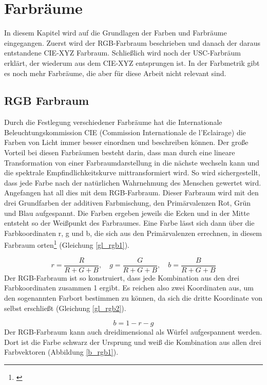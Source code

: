 \chapter{Farbräume} 
In diesem Kapitel wird auf die Grundlagen der Farben und Farbräume eingegangen. Zuerst wird der RGB-Farbraum beschrieben und danach der daraus entstandene CIE-XYZ Farbraum. Schließlich wird noch der USC-Farbräum erklärt, der wiederum aus dem CIE-XYZ entsprungen ist. In der Farbmetrik gibt es noch mehr Farbräume, die aber für diese Arbeit nicht relevant sind.
 
\section{RGB Farbraum} \label{sec_rgb}
Durch die Festlegung verschiedener Farbräume hat die  Internationale Beleuchtungskommission CIE (\glqq Commission Internationale de l'Eclairage\grqq) die Farben von Licht immer besser einordnen und beschreiben können. Der große Vorteil bei diesen Farbräumen besteht darin, dass man durch eine lineare Transformation von einer Farbraumdarstellung in die nächste wechseln kann und die spektrale Empfindlichkeitskurve mittransformiert wird. So wird sichergestellt, dass jede Farbe nach der natürlichen Wahrnehmung des Menschen gewertet wird.
Angefangen hat all dies mit dem RGB-Farbraum. Dieser Farbraum wird mit den drei Grundfarben der additiven Farbmischung, den Primärvalenzen Rot, Grün und Blau aufgespannt. Die Farben ergeben jeweils die Ecken und in der Mitte entsteht so der Weißpunkt des Farbraumes. Eine Farbe lässt sich dann über die Farbkoordinaten r, g und b, die sich aus den Primärvalenzen errechnen, in diesem Farbraum orten\footnote{\cite[106]{hentschel}} (Gleichung \ref{gl_rgb1}).

\begin{equation}\label{gl_rgb1}
		r = \frac{R}{R+G+B},\quad g = \frac{G}{R+G+B},\quad b = \frac{B}{R+G+B}
\end{equation}
Der RGB-Farbraum ist so konstruiert, dass jede Kombination aus den drei Farbkoordinaten zusammen 1 ergibt. Es reichen also zwei Koordinaten aus, um den sogenannten Farbort bestimmen zu können, da sich die dritte Koordinate von selbst erschließt (Gleichung \ref{gl_rgb2}). 

\begin{equation}\label{gl_rgb2}
		b=1-r-g
\end{equation}
Der RGB-Farbraum kann auch dreidimensional als Würfel aufgespannent werden. Dort ist die Farbe schwarz der Ursprung und weiß die Kombination aus allen drei Farbvektoren (Abbildung \ref{b_rgb1}).

